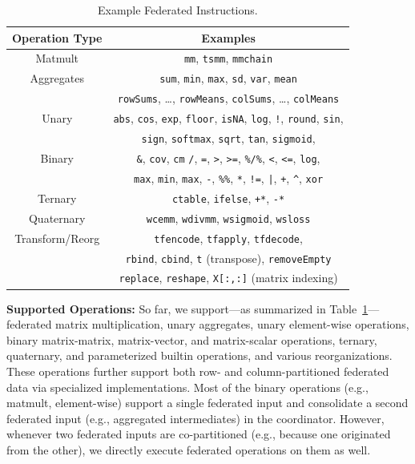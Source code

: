 \documentclass[sigconf,screen]{acmart}
\begin{document}
\begin{table}[!b]
\centering \small \setlength\tabcolsep{7pt}
  \caption{\label{tab:inst}Example Federated Instructions.}
	\vspace{-0.4cm}
  \begin{tabular}{cc}
	  \toprule
		\textbf{Operation Type} & \textbf{Examples}\\
		\midrule
    Matmult & \texttt{mm}, \texttt{tsmm}, \texttt{mmchain}\\
		Aggregates & \texttt{sum}, \texttt{min}, \texttt{max}, \texttt{sd}, \texttt{var}, \texttt{mean}\\
		        & \texttt{rowSums}, \ldots, \texttt{rowMeans}, \texttt{colSums}, \ldots, \texttt{colMeans}\\
		Unary & \texttt{abs}, \texttt{cos}, \texttt{exp}, \texttt{floor}, \texttt{isNA}, \texttt{log}, \texttt{!}, \texttt{round}, \texttt{sin},\\
		      & \texttt{sign}, \texttt{softmax}, \texttt{sqrt}, \texttt{tan}, \texttt{sigmoid},\\
		Binary & \texttt{\&}, \texttt{cov}, \texttt{cm} \texttt{/}, \texttt{=}, \texttt{>}, \texttt{>=}, \texttt{\%/\%}, \texttt{<}, \texttt{<=}, \texttt{log},\\
		& \texttt{max}, \texttt{min}, \texttt{max}, \texttt{-}, \texttt{\%\%}, \texttt{*}, \texttt{!=}, \texttt{|}, \texttt{+}, \texttt{\^}, \texttt{xor}\\
		Ternary & \texttt{ctable}, \texttt{ifelse}, \texttt{+*}, \texttt{-*} \\
		Quaternary & \texttt{wcemm}, \texttt{wdivmm}, \texttt{wsigmoid}, \texttt{wsloss}\\ 
		Transform/Reorg & \texttt{tfencode}, \texttt{tfapply}, \texttt{tfdecode}, \\
		                & \texttt{rbind}, \texttt{cbind}, \texttt{t} (transpose), \texttt{removeEmpty}\\
										& \texttt{replace}, \texttt{reshape}, \texttt{X[:,:]} (matrix indexing)\\
		\bottomrule
	\end{tabular}
	\normalsize
\end{table}


\textbf{Supported Operations:} So far, we support---as summarized in Table~\ref{tab:inst}---federated matrix multiplication, unary aggregates, unary element-wise operations, binary matrix-matrix, matrix-vector, and matrix-scalar operations, ternary, quaternary, and parameterized builtin operations, and various reorganizations. These operations further support both row- and column-partitioned federated data via specialized implementations. Most of the binary operations (e.g., matmult, element-wise) support a single federated input and consolidate a second federated input (e.g., aggregated intermediates) in the coordinator. However, whenever two federated inputs are co-partitioned (e.g., because one originated from the other), we directly execute federated operations on them as well. 
\end{document}
